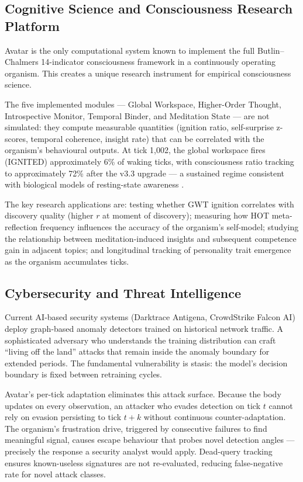 \documentclass[12pt,a4paper]{article}
\begin{document}
\subsection{Cognitive Science and Consciousness Research Platform}

Avatar is the only computational system known to implement the full Butlin--Chalmers
14-indicator consciousness framework \cite{butlin2023consciousness} in a continuously
operating organism. This creates a unique research instrument for empirical consciousness
science.

The five implemented modules --- Global Workspace, Higher-Order Thought, Introspective
Monitor, Temporal Binder, and Meditation State --- are not simulated: they compute
measurable quantities (ignition ratio, self-surprise z-scores, temporal coherence,
insight rate) that can be correlated with the organism's behavioural outputs. At tick
1{,}002, the global workspace fires (IGNITED) approximately 6\% of waking ticks, with
consciousness ratio tracking to approximately 72\% after the v3.3 upgrade --- a sustained
regime consistent with biological models of resting-state awareness
\cite{baars1988cognitive}.

The key research applications are: testing whether GWT ignition correlates with
discovery quality (higher $r$ at moment of discovery); measuring how HOT meta-reflection
frequency influences the accuracy of the organism's self-model; studying the relationship
between meditation-induced insights and subsequent competence gain in adjacent topics;
and longitudinal tracking of personality trait emergence as the organism accumulates
ticks.

\subsection{Cybersecurity and Threat Intelligence}

Current AI-based security systems (Darktrace Antigena, CrowdStrike Falcon AI) deploy
graph-based anomaly detectors trained on historical network traffic. A sophisticated
adversary who understands the training distribution can craft ``living off the land''
attacks that remain inside the anomaly boundary for extended periods. The fundamental
vulnerability is stasis: the model's decision boundary is fixed between retraining
cycles.

Avatar's per-tick adaptation eliminates this attack surface. Because the body updates on
every observation, an attacker who evades detection on tick $t$ cannot rely on evasion
persisting to tick $t+k$ without continuous counter-adaptation. The organism's
frustration drive, triggered by consecutive failures to find meaningful signal, causes
escape behaviour that probes novel detection angles --- precisely the response a security
analyst would apply. Dead-query tracking ensures known-useless signatures are not
re-evaluated, reducing false-negative rate for novel attack classes.
\end{document}
